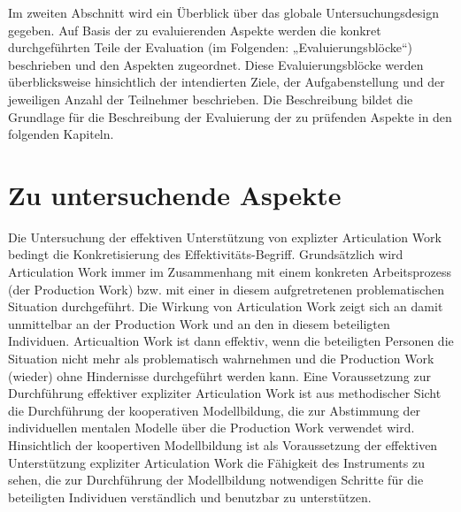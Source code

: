 Im zweiten Abschnitt wird ein Überblick über das globale Untersuchungsdesign gegeben. Auf Basis der zu evaluierenden Aspekte werden die konkret durchgeführten Teile der Evaluation (im Folgenden: „Evaluierungsblöcke“) beschrieben und den Aspekten zugeordnet. Diese Evaluierungsblöcke werden überblicksweise hinsichtlich der intendierten Ziele, der Aufgabenstellung und der jeweiligen Anzahl der Teilnehmer beschrieben. Die Beschreibung bildet die Grundlage für die Beschreibung der Evaluierung der zu prüfenden Aspekte in den folgenden Kapiteln.

\section{Zu untersuchende Aspekte} %
\label{sec:untersuchungsaspekte}

Die Untersuchung der effektiven Unterstützung von explizter Articulation Work bedingt die Konkretisierung des Effektivitäts-Begriff. Grundsätzlich wird Articulation Work immer im Zusammenhang mit einem konkreten Arbeitsprozess (der Production Work) bzw. mit einer in diesem aufgretretenen problematischen Situation durchgeführt. Die Wirkung von Articulation Work zeigt sich an damit unmittelbar an der Production Work und an den in diesem beteiligten Individuen. Articualtion Work ist dann effektiv, wenn die beteiligten Personen die Situation nicht mehr als problematisch wahrnehmen  und die Production Work (wieder) ohne Hindernisse durchgeführt werden kann. Eine Voraussetzung zur Durchführung effektiver expliziter Articulation Work ist aus methodischer Sicht die Durchführung der kooperativen Modellbildung, die zur Abstimmung der individuellen mentalen Modelle über die Production Work verwendet wird. Hinsichtlich der koopertiven Modellbildung ist als Voraussetzung der effektiven Unterstützung expliziter Articulation Work die Fähigkeit des Instruments zu sehen, die zur Durchführung der Modellbildung notwendigen Schritte für die beteiligten Individuen verständlich und benutzbar zu unterstützen.


